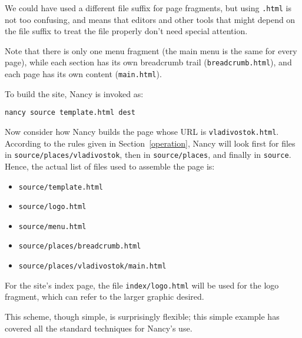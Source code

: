 \documentclass[english]{scrartcl}
\begin{document}
We could have used a different file suffix for page fragments, but using \verb|.html| is not too confusing, and means that editors and other tools that might depend on the file suffix to treat the file properly don't need special attention.

Note that there is only one menu fragment (the main menu is the same for every page), while each section has its own breadcrumb trail (\verb|breadcrumb.html|), and each page has its own content (\verb|main.html|).

To build the site, Nancy is invoked as:

\begin{verbatim}
nancy source template.html dest
\end{verbatim}

Now consider how Nancy builds the page whose URL is \verb|vladivostok.html|. According to the rules given in Section~\ref{operation}, Nancy will look first for files in \verb|source/places/vladivostok|, then in \verb|source/places|, and finally in \verb|source|. Hence, the actual list of files used to assemble the page is:

\begin{itemize}
\item \verb|source/template.html|
\item \verb|source/logo.html|
\item \verb|source/menu.html|
\item \verb|source/places/breadcrumb.html|
\item \verb|source/places/vladivostok/main.html|
\end{itemize}

For the site's index page, the file \verb|index/logo.html| will be used for the logo fragment, which can refer to the larger graphic desired.

This scheme, though simple, is surprisingly flexible; this simple example has covered all the standard techniques for Nancy's use.
\end{document}
